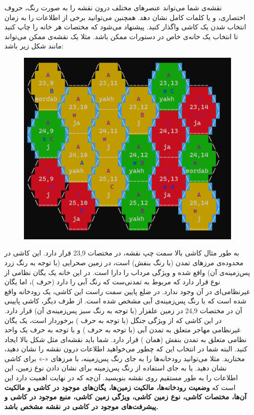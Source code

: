 \documentclass[]{article}
\begin{document}
نقشه‌ی شما می‌تواند عنصرهای مختلف درون نقشه را به صورت رنگ، حروف اختصاری، و یا کلمات کامل نشان دهد. همچنین می‌توانید برخی از اطلاعات را به زمان انتخاب شدن یک کاشی واگذار کنید. پیشنهاد می‌شود که مختصات هر خانه را چاپ کنید تا انتخاب یک خانه‌ی خاص در دستورات ممکن باشد.
مثلا یک نقشه‌ی ممکن می‌تواند مانند شکل زیر باشد:
\begin{figure}[H]
    \centerline{\includegraphics[scale=0.8]{Resources/map.png}}
\end{figure}
به طور مثال کاشی بالا سمت چپ نقشه، در مختصات 23,9 قرار دارد. این کاشی در محدوده‌ی مرزهای تمدن  (با رنگ بنفش) است، در زمین صحرایی (با توجه به رنگ زرد پس‌زمینه‌ی آن)  واقع شده و ویژگی مرداب را دارا است. در این خانه یک یگان نظامی از نوع  قرار دارد که مربوط به تمدنی‌ست که رنگ آبی را دارد (حرف )، اما یگان غیرنظامی‌ای در آن وجود ندارد. در ضلع پایین سمت راست این کاشی، یک رودخانه واقع شده است که با رنگ پس‌زمینه‌ی آبی مشخص شده است.
از طرف دیگر، کاشی پایینی آن در مختصات 24,9 در زمین علفزار (با توجه به رنگ سبز پس‌زمینه‌ی آن) قرار دارد. در این کاشی که از ویژگی جنگل (با توجه به حرف ) برخوردار است، یک یگان غیرنظامی مهاجر متعلق به تمدن آبی (با توحه به حرف ) و با توجه به حرف  یک واحد نظامی  متعلق به تمدن بنفش (همان ) قرار دارد.
شما باید نقشه‌ای مثل شکل بالا ایجاد کنید. البته شما در انتخاب این که چطور می‌خواهید اطلاعات درون نقشه را نشان دهید، مختارید. مثلا می‌توانید رودخانه‌ها را به جای رنگ پس‌زمینه، با مرزهای «-» برای کاشی نشان دهید. یا به جای استفاده از رنگ پس‌زمینه برای نشان دادن نوع زمین، این اطلاعات را به طور مستقیم روی نقشه بنویسید. آن‌چه که در نهایت اهمیت دارد این است که \textbf{وضعیت رودخانه‌ها، مالکیت زمین‌ها، یگان‌های موجود در کاشی و مالکیت آن‌ها، مختصات کاشی، نوع زمین کاشی، ویژگی زمین کاشی، منبع موجود در کاشی و پیشرفت‌های موجود در کاشی  در نقشه مشخص باشد.}
\end{document}
